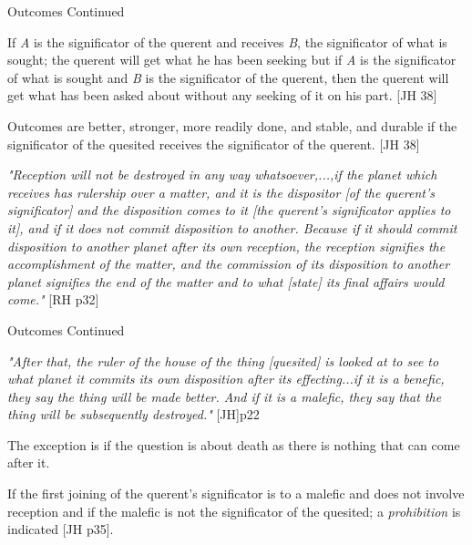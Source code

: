 \begin{frame}[t]{Outcomes Continued}

If \textsl{A} is the significator of the querent and receives \textsl{B}, the significator of what is sought; the querent will get what he has been seeking but if \textsl{A} is the significator of what is sought and \textsl{B} is the significator of the querent, then the querent will get what has been asked about without any seeking of it on his part. [JH 38]

Outcomes are better, stronger, more readily done, and stable, and durable if the significator of the quesited receives the significator of the querent. [JH 38]

\begin{block}{}
\textsl{"Reception will not be destroyed in any way whatsoever,...,if the planet which receives has rulership over a matter, and it is the dispositor [of the querent's significator] and the disposition comes to it [the querent's significator applies to it], and if it does not commit disposition to another. Because if it should commit disposition to another planet after its own reception, the reception signifies the accomplishment of the matter, and the commission of its disposition to another planet signifies the end of the matter and to what [state] its final affairs would come."} [RH p32]
\end{block}

\end{frame}
\begin{frame}[t]{Outcomes Continued}

\begin{block}{}
\textsl{"After that, the ruler of the house of the thing [quesited] is looked at to see to what planet it commits its own disposition after its effecting...if it is a benefic, they say the thing will be made better. And if it is a malefic, they say that the thing will be subsequently destroyed."} [JH]p22
\end{block}

The exception is if the question is about death as there is nothing that can come after it.

If the first joining of the querent's significator is to a malefic and does not involve reception and if the malefic is not the significator of the quesited;  a \textsl{prohibition} is indicated [JH p35].

\end{frame}